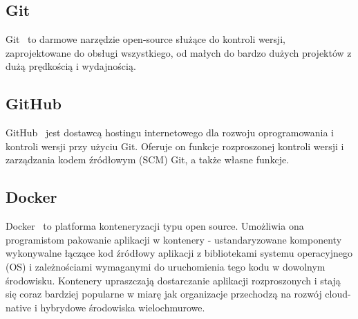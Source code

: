 	\subsection{Git}
	Git~\cite{git} to darmowe narzędzie open-source służące do kontroli wersji, zaprojektowane do obsługi wszystkiego, od małych do bardzo dużych projektów z dużą prędkością i wydajnością.	
	
	\subsection{GitHub}
	GitHub~\cite{github} jest dostawcą hostingu internetowego dla rozwoju oprogramowania i kontroli wersji przy użyciu Git. Oferuje on funkcje rozproszonej kontroli wersji i zarządzania kodem źródłowym (SCM) Git, a także własne funkcje.
	
	\subsection{Docker}
	Docker~\cite{docker} to platforma konteneryzacji typu open source. Umożliwia ona programistom pakowanie aplikacji w kontenery - ustandaryzowane komponenty wykonywalne łączące kod źródłowy aplikacji z bibliotekami systemu operacyjnego (OS) i zależnościami wymaganymi do uruchomienia tego kodu w dowolnym środowisku. Kontenery upraszczają dostarczanie aplikacji rozproszonych i stają się coraz bardziej popularne w miarę jak organizacje przechodzą na rozwój cloud-native i hybrydowe środowiska wielochmurowe.
	
